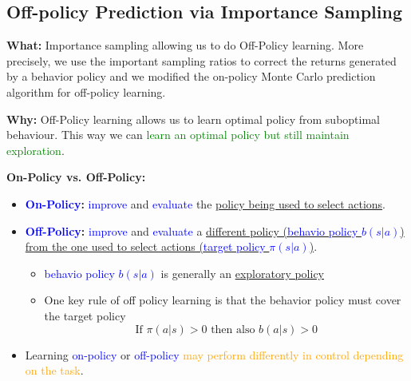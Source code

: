 \documentclass[12pt, a4paper]{article}
\begin{document}
\subsection{Off-policy Prediction via Importance Sampling}\label{off-policy-prediction-via-importance-sampling}

\textbf{What:} Importance sampling allowing us to do Off-Policy learning. More precisely, we use the important sampling ratios to correct the returns generated by a behavior policy and we modified the on-policy Monte Carlo prediction algorithm for off-policy learning.

\textbf{Why:} Off-Policy learning allows us to learn optimal policy from suboptimal behaviour. This way we can \textcolor{Green}{learn an optimal policy but still maintain exploration}.

\textbf{On-Policy vs. Off-Policy:}
\begin{itemize}
  \item \textbf{\textcolor{Blue}{On-Policy}:} \textcolor{blue}{improve} and \textcolor{blue}{evaluate} the \uline{policy being used to select actions}.
  \item \textbf{\textcolor{Blue}{Off-Policy}:} \textcolor{blue}{improve} and \textcolor{blue}{evaluate} a \uline{different policy (\textcolor{Blue}{behavio policy $b(s|a)$}) from the one used to select actions (\textcolor{Blue}{target policy $\pi(s|a)$})}.
  \begin{itemize}
    \item \textcolor{Blue}{behavio policy $b(s|a)$} is generally an \uline{exploratory policy}
    \item One key rule of off policy learning is that the behavior policy must cover the target policy
    $$
    \text{If } \pi(a|s) > 0 \text{ then also } b(a|s) > 0
    $$
  \end{itemize}
  \item Learning \textcolor{Blue}{on-policy} or \textcolor{Blue}{off-policy} \textcolor{Orange}{may perform differently in control depending on the task}.
\end{itemize}
\end{document}
